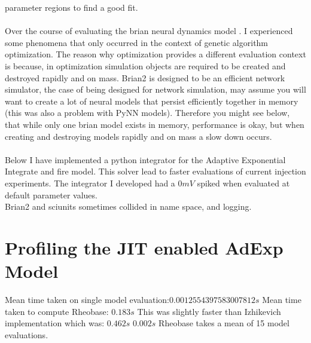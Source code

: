 parameter regions to find a good fit.\\
\\
Over the course of evaluating the brian neural dynamics model \cite{gerstner2014neuronal}. I experienced some phenomena that only occurred in the context of genetic algorithm optimization. The reason why optimization provides a different evaluation context is because, in optimization simulation objects are required to be created and destroyed rapidly and on mass. Brian2 is designed to be an efficient network simulator, the case of being designed for network simulation, may assume you will want to create a lot of neural models that persist efficiently together in memory (this was also a problem with PyNN models). Therefore you might see below, that while only one brian model exists in memory, performance is okay, but when creating and destroying models rapidly and on mass a slow down occurs.\\
\\
Below I have implemented a python integrator for the Adaptive
Exponential Integrate and fire model. This solver lead to faster
evaluations of current injection experiments. The integrator I developed
had a $0mV$ spiked when evaluated at default
parameter values.\\


Brian2 and sciunits sometimes collided in name space, and logging.

\section{Profiling the JIT enabled AdExp Model}
Mean time taken on single model evaluation:$ 0.0012554397583007812s $
Mean time taken to compute Rheobase:
$0.183s $
This was slightly faster than Izhikevich implementation which was: $ 0.462s $ $  0.002 s$
Rheobase takes a mean of 15 model evaluations.



